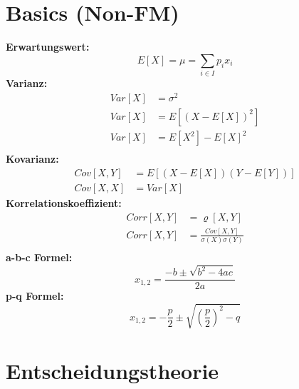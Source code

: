 \documentclass[leqno]{scrartcl}
\begin{document}
\begin{multicols}{4}


\section{Basics (Non-FM)}

\textbf{Erwartungswert:}
  \begin{equation*}
    E[X]=\mu=\sum_{i \in I} p_i x_i
  \end{equation*}
\textbf{Varianz:}
  \begin{equation*}
    \begin{split}
      Var[X]&=\sigma^2\\
      Var[X]&=E[(X-E[X])^2]\\
      Var[X]&=E[X^2]-E[X]^2\\
    \end{split}
  \end{equation*}
\textbf{Kovarianz:}
  \begin{equation*}
    \begin{split}
    Cov[X,Y]&=E[(X-E[X])(Y-E[Y])]\\
    Cov[X,X]&=Var[X]
    \end{split}
  \end{equation*}
\textbf{Korrelationskoeffizient:}
  \begin{equation*}
    \begin{split}
      Corr[X,Y] &= \varrho [X,Y]\\
      Corr[X,Y] &= \frac{Cov[X,Y]}{\sigma (X) \sigma (Y)}\\
    \end{split}
  \end{equation*}
\textbf{a-b-c Formel:}
  \begin{equation*}
    x_{1,2}=\frac{-b \pm \sqrt{b^2 - 4ac}}{2a}
  \end{equation*}
\textbf{p-q Formel:}
  \begin{equation*}
    x_{1,2}=-\frac{p}{2}\pm\sqrt{\left(\frac{p}{2}\right)^2-q}
  \end{equation*}


\section{Entscheidungstheorie}


\end{multicols}
\end{document}
